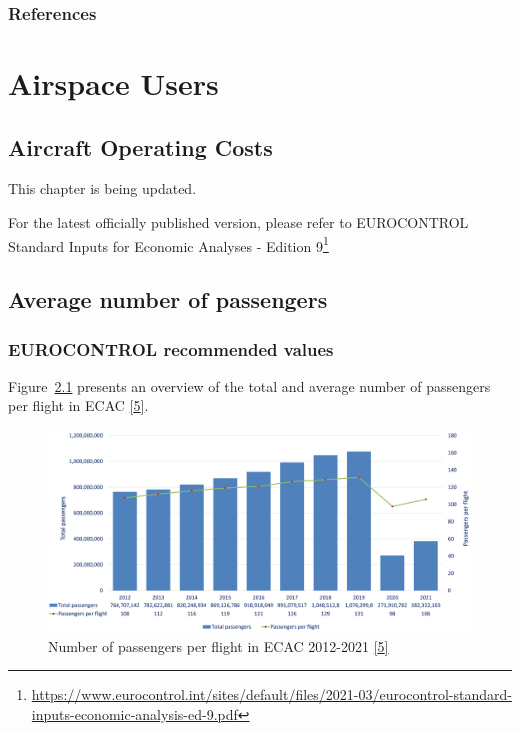 \documentclass[
  11pt,
  a4paper,
]{book}
\DeclareRobustCommand{\href}[2]{#2\footnote{\url{#1}}}
\begin{document}
\hypertarget{references-9}{%
\section{References}\label{references-9}}

\part{Airspace Users}

\hypertarget{sec-aircraft-operating-costs}{%
\chapter{Aircraft Operating Costs}\label{sec-aircraft-operating-costs}}

This chapter is being updated.

For the latest officially published version, please refer to
\href{https://www.eurocontrol.int/sites/default/files/2021-03/eurocontrol-standard-inputs-economic-analysis-ed-9.pdf}{EUROCONTROL
Standard Inputs for Economic Analyses - Edition 9}

\hypertarget{sec-average-number-of-passengers}{%
\chapter{Average number of
passengers}\label{sec-average-number-of-passengers}}

\hypertarget{eurocontrol-recommended-values-7}{%
\section{EUROCONTROL recommended
values}\label{eurocontrol-recommended-values-7}}

Figure~\ref{fig-number-of-passengers} presents an overview of the total
and average number of passengers per flight in ECAC
\protect\hyperlink{ref-ectrl:statfor:sid}{{[}5{]}}.

\begin{figure}

{\centering \includegraphics{./figures/number_passengers.png}

}

\caption{\label{fig-number-of-passengers}Number of passengers per flight
in ECAC 2012-2021 \protect\hyperlink{ref-ectrl:statfor:sid}{{[}5{]}}}

\end{figure}
\end{document}
